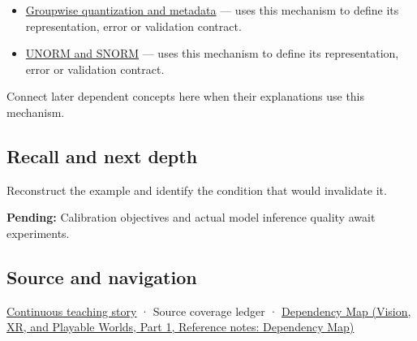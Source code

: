 \hypertarget{appendix-d5da3eaabaef-used-by}{}

\begin{itemize}
\tightlist
\item
  \hyperref[appendix-638204c40e8b]{Groupwise quantization and metadata} --- uses this mechanism to define its representation, error or validation contract.
\item
  \hyperref[appendix-b2402c453dac]{UNORM and SNORM} --- uses this mechanism to define its representation, error or validation contract.
\end{itemize}

Connect later dependent concepts here when their explanations use this mechanism.

\subsection{Recall and next depth}\label{appendix-d5da3eaabaef-recall-and-next-depth}

\hypertarget{appendix-d5da3eaabaef-recall-and-next-depth}{}

Reconstruct the example and identify the condition that would invalidate it.

\textbf{Pending:} Calibration objectives and actual model inference quality await experiments.

\subsection{Source and navigation}\label{appendix-d5da3eaabaef-source-and-navigation}

\hypertarget{appendix-d5da3eaabaef-source-and-navigation}{}

\hyperref[01-foundations-i-ch001-choosing-what-information-to-keep]{Continuous teaching story} · {Source coverage ledger} · \href{../07-Vision-XR-and-Playable-Worlds-P01/main.pdf\#nameddest=appendix-4ad47bdd269a}{Dependency Map (Vision, XR, and Playable Worlds, Part 1, Reference notes: Dependency Map)}
